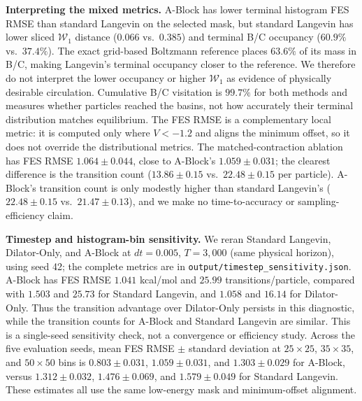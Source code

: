 \documentclass{article}
\begin{document}
\textbf{Interpreting the mixed metrics.} A-Block has lower terminal histogram FES RMSE than standard Langevin on the selected mask, but standard Langevin has lower sliced $\mathcal{W}_1$ distance ($0.066$ vs.\ $0.385$) and terminal B/C occupancy ($60.9\%$ vs.\ $37.4\%$). The exact grid-based Boltzmann reference places $63.6\%$ of its mass in B/C, making Langevin's terminal occupancy closer to the reference. We therefore do not interpret the lower occupancy or higher $\mathcal{W}_1$ as evidence of physically desirable circulation. Cumulative B/C visitation is $99.7\%$ for both methods and measures whether particles reached the basins, not how accurately their terminal distribution matches equilibrium. The FES RMSE is a complementary local metric: it is computed only where $V<-1.2$ and aligns the minimum offset, so it does not override the distributional metrics. The matched-contraction ablation has FES RMSE $1.064\pm0.044$, close to A-Block's $1.059\pm0.031$; the clearest difference is the transition count ($13.86\pm0.15$ vs.\ $22.48\pm0.15$ per particle). A-Block's transition count is only modestly higher than standard Langevin's ($22.48\pm0.15$ vs.\ $21.47\pm0.13$), and we make no time-to-accuracy or sampling-efficiency claim.

\textbf{Timestep and histogram-bin sensitivity.} We reran Standard Langevin, Dilator-Only, and A-Block at $dt=0.005$, $T=3{,}000$ (same physical horizon), using seed 42; the complete metrics are in \texttt{output/timestep\_sensitivity.json}. A-Block has FES RMSE $1.041$ kcal/mol and $25.99$ transitions/particle, compared with $1.503$ and $25.73$ for Standard Langevin, and $1.058$ and $16.14$ for Dilator-Only. Thus the transition advantage over Dilator-Only persists in this diagnostic, while the transition counts for A-Block and Standard Langevin are similar. This is a single-seed sensitivity check, not a convergence or efficiency study. Across the five evaluation seeds, mean FES RMSE $\pm$ standard deviation at $25\times25$, $35\times35$, and $50\times50$ bins is $0.803\pm0.031$, $1.059\pm0.031$, and $1.303\pm0.029$ for A-Block, versus $1.312\pm0.032$, $1.476\pm0.069$, and $1.579\pm0.049$ for Standard Langevin. These estimates all use the same low-energy mask and minimum-offset alignment.
\end{document}
